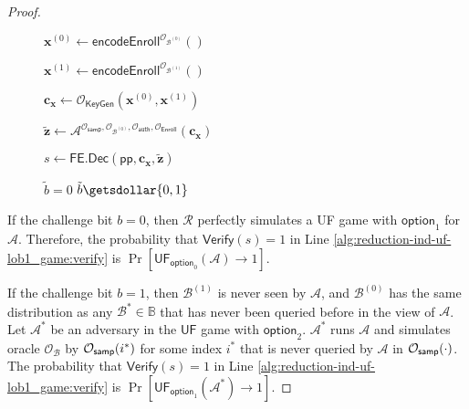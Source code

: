 \begin{proof}
\begin{figure}[h]
\begin{minipage}[t]{0.5\linewidth}
\begin{algorithm}[H]
\begin{algorithmic}[1]
		\State $\mathbf{x}^{(0)} \gets \textsf{encodeEnroll}^{\mathcal{O}_{\mathcal{B}^{(0)}}}()$

		\State $\mathbf{x}^{(1)} \gets \textsf{encodeEnroll}^{\mathcal{O}_{\mathcal{B}^{(1)}}}()$

		\State $\mathbf{c_x} \gets \mathcal{O}_{\textsf{KeyGen}}(\mathbf{x}^{(0)}, \mathbf{x}^{(1)})$

		\State ${\mathbf{\tilde{z}}} \gets \mathcal{A}^{\mathcal{O}_{\textsf{samp}}, \mathcal{O}_{\mathcal{B}^{(0)}}, \mathcal{O}_\textsf{auth}, \mathcal{O}_{\textsf{Enroll}} } ( \mathbf{c_x})$

		\State $s \gets \textsf{FE.Dec}( \textsf{pp}, \mathbf{c_x}, \mathbf{\tilde{z}} )$

		 \label{alg:reduction-ind-uf-lob1_game:verify}
			\State \Return $\tilde{b} = 0$
		\Else
			\State \Return $\tilde{b} \getsdollar \{0, 1\}$
		\EndIf

	\end{algorithmic}
	\end{algorithm}
	\end{minipage}
	
\label{fig:reduction-ind-uf-lob1_game}
\end{figure}

	If the challenge bit $b = 0$, then $\mathcal{R}$ perfectly simulates a \textsf{UF} game with $\textsf{option}_1$ for $\mathcal{A}$. Therefore, the probability that $\textsf{Verify}(s) = 1$ in Line \ref{alg:reduction-ind-uf-lob1_game:verify} is $\Pr[\textsf{UF}_{\textsf{option}_0}(\mathcal{A}) \to 1]$.

	If the challenge bit $b = 1$, then $\mathcal{B}^{(1)}$ is never seen by $\mathcal{A}$, and $\mathcal{B}^{(0)}$ has the same distribution as any $\mathcal{B}^* \in \mathbb{B}$ that has never been queried before in the view of $\mathcal{A}$. Let $\mathcal{A}^*$ be an adversary in the $\textsf{UF}$ game with $\textsf{option}_2$. $\mathcal{A}^*$ runs $\mathcal{A}$ and simulates oracle $\mathcal{O}_{\mathcal{B}}$ by $\mathcal{O}_{\sf samp}(i^*)$ for some index $i^*$ that is never queried by $\mathcal{A}$ in $\mathcal{O}_{\sf samp}(\cdot)$. The probability that $\textsf{Verify}(s) = 1$ in Line \ref{alg:reduction-ind-uf-lob1_game:verify} is $\Pr[ \textsf{UF}_{\textsf{option}_1}(\mathcal{A}^*) \to 1 ]$.


\end{proof}
